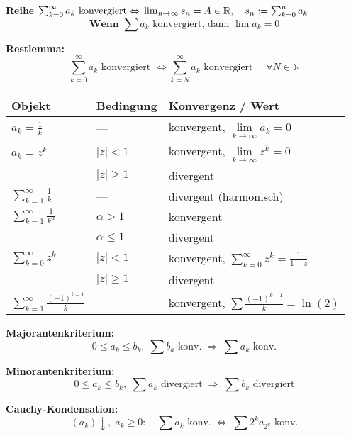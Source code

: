 \textbf{Reihe }
$
\sum_{k=0}^\infty a_k \text{ konvergiert} \Leftrightarrow \newline
\lim_{n \to \infty} s_n = A \in \mathbb{R},\quad s_n := \sum_{k=0}^n a_k
$
\[
\textbf{Wenn } \sum a_k \text{ konvergiert, dann } \lim a_k = 0
\]

\textbf{Restlemma:}  
\[
\sum_{k=0}^\infty a_k \text{ konvergiert } \Leftrightarrow  
\sum_{k=N}^\infty a_k \text{ konvergiert } \quad \forall N \in \mathbb{N}
\]
\footnotesize
\renewcommand{\arraystretch}{1.3}

\begin{center}
\begin{tabular}{|>{\centering\arraybackslash}p{1.4cm}|
                >{\centering\arraybackslash}p{1.7cm}|
                >{\centering\arraybackslash}p{2.4cm}|}
\hline
\textbf{Objekt} & \textbf{Bedingung} & \textbf{Konvergenz / Wert} \\
\hline
$a_k = \frac{1}{k}$ 
  & — 
  & konvergent, $\lim\limits_{k\to\infty} a_k = 0$ \\
\hline
$a_k = z^k$ 
  & $|z|<1$ 
  & konvergent, $\lim\limits_{k\to\infty} z^k = 0$ \\
  & $|z|\ge 1$ 
  & divergent \\
\hline
$\sum\limits_{k=1}^\infty \frac{1}{k}$ 
  & — 
  & divergent (harmonisch) \\
\hline
$\sum\limits_{k=1}^\infty \frac{1}{k^\alpha}$ 
  & $\alpha > 1$ 
  & konvergent \\
  & $\alpha \le 1$ 
  & divergent \\
\hline
$\sum\limits_{k=0}^\infty z^k$ 
  & $|z|<1$ 
  & konvergent, $\sum\limits_{k=0}^\infty z^k = \frac{1}{1-z}$ \\
  & $|z|\ge 1$ 
  & divergent \\
\hline
$\sum\limits_{k=1}^\infty \frac{(-1)^{k-1}}{k}$ 
  & — 
  & konvergent, $\sum\limits \frac{(-1)^{k-1}}{k} = \ln(2)$ \\
\hline
\end{tabular}
\end{center}


\textbf{Majorantenkriterium:}  
\[
0 \leq a_k \leq b_k,\; \sum b_k \text{ konv.} \;\Rightarrow\; \sum a_k \text{ konv.}
\]

\textbf{Minorantenkriterium:}  
\[
0 \leq a_k \leq b_k,\; \sum a_k \text{ divergiert} \;\Rightarrow\; \sum b_k \text{ divergiert}
\]

\textbf{Cauchy-Kondensation:}  
\[
(a_k) \downarrow,\; a_k \geq 0:  
\quad \sum a_k \text{ konv.} \;\Leftrightarrow\; \sum 2^k a_{2^k} \text{ konv.}
\]

